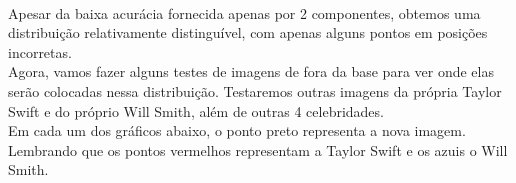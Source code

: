 \documentclass{article}
\begin{document}
    \begin{center}
    \end{center}
    { \hspace*{\fill} \\}
    
    Apesar da baixa acurácia fornecida apenas por 2 componentes, obtemos uma
distribuição relativamente distinguível, com apenas alguns pontos em
posições incorretas.\\

Agora, vamos fazer alguns testes de imagens de fora da base para ver
onde elas serão colocadas nessa distribuição. Testaremos outras imagens
da própria Taylor Swift e do próprio Will Smith, além de outras 4
celebridades.\\

Em cada um dos gráficos abaixo, o ponto preto representa a nova imagem.
Lembrando que os pontos vermelhos representam a Taylor Swift e os azuis
o Will Smith.
\end{document}
